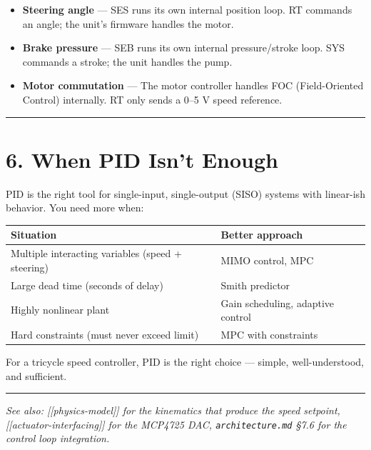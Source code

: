 \documentclass[12pt,a4paper,oneside]{report}
\providecommand{\tightlist}{\setlength{\itemsep}{0pt}\setlength{\parskip}{0pt}}
\begin{document}
\begin{itemize}
\tightlist
\item
  \textbf{Steering angle} --- SES runs its own internal position loop. RT
  commands an angle; the unit's firmware handles the motor.
\item
  \textbf{Brake pressure} --- SEB runs its own internal pressure/stroke loop.
  SYS commands a stroke; the unit handles the pump.
\item
  \textbf{Motor commutation} --- The motor controller handles FOC
  (Field-Oriented Control) internally. RT only sends a 0--5 V speed reference.
\end{itemize}

\begin{center}\rule{0.5\linewidth}{0.5pt}\end{center}

\section{6. When PID Isn't Enough}\label{when-pid-isnt-enough}

PID is the right tool for single-input, single-output (SISO) systems with
linear-ish behavior. You need more when:

\begin{longtable}[]{@{}ll@{}}
\toprule\noalign{}
Situation & Better approach \\
\midrule\noalign{}
\endhead
\bottomrule\noalign{}
\endlastfoot
Multiple interacting variables (speed + steering) & MIMO control, MPC \\
Large dead time (seconds of delay) & Smith predictor \\
Highly nonlinear plant & Gain scheduling, adaptive control \\
Hard constraints (must never exceed limit) & MPC with constraints \\
\end{longtable}

For a tricycle speed controller, PID is the right choice --- simple,
well-understood, and sufficient.

\begin{center}\rule{0.5\linewidth}{0.5pt}\end{center}

\emph{See also: {[}{[}physics-model{]}{]} for the kinematics that produce the
speed setpoint, {[}{[}actuator-interfacing{]}{]} for the MCP4725 DAC,
\texttt{architecture.md} §7.6 for the control loop integration.}
\end{document}
